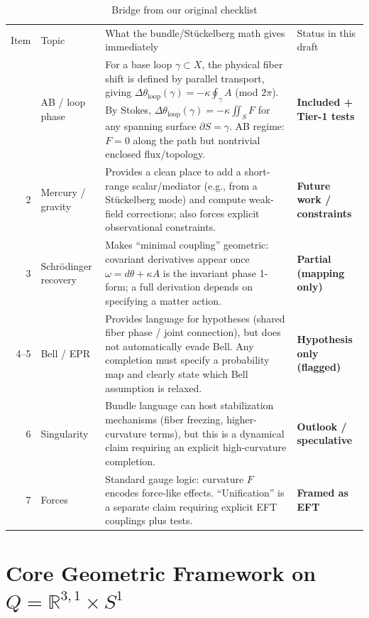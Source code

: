 ﻿\documentclass[twocolumn,aps,prd,nofootinbib]{revtex4-2}
\begin{document}
\begin{table}[!htbp]
\caption{Bridge from our original checklist}
\begin{ruledtabular}
\begin{tabular}{r l p{} p{}}
                Item & Topic & What the bundle/St\"uckelberg math gives immediately & Status in this draft \\
\colrule
1 & AB / loop phase & For a base loop $\gamma\subset X$, the physical fiber shift is defined by parallel transport, giving $\Delta\theta_{\mathrm{loop}}(\gamma)=-\kappa\oint_\gamma A$ (mod $2\pi$). By Stokes, $\Delta\theta_{\mathrm{loop}}(\gamma)=-\kappa\iint_S F$ for any spanning surface $\partial S=\gamma$. AB regime: $F=0$ along the path but nontrivial enclosed flux/topology. & \textbf{Included + Tier-1 tests} \\
2 & Mercury / gravity & Provides a clean place to add a short-range scalar/mediator (e.g., from a St\"uckelberg mode) and compute weak-field corrections; also forces explicit observational constraints. & \textbf{Future work / constraints} \\
3 & Schr\"odinger recovery & Makes ``minimal coupling'' geometric: covariant derivatives appear once $\omega=d\theta+\kappa A$ is the invariant phase 1-form; a full derivation depends on specifying a matter action. & \textbf{Partial (mapping only)} \\
4--5 & Bell / EPR & Provides language for hypotheses (shared fiber phase / joint connection), but does not automatically evade Bell. Any completion must specify a probability map and clearly state which Bell assumption is relaxed. & \textbf{Hypothesis only (flagged)} \\
6 & Singularity & Bundle language can host stabilization mechanisms (fiber freezing, higher-curvature terms), but this is a dynamical claim requiring an explicit high-curvature completion. & \textbf{Outlook / speculative} \\
7 & Forces & Standard gauge logic: curvature $F$ encodes force-like effects. ``Unification'' is a separate claim requiring explicit EFT couplings plus tests. & \textbf{Framed as EFT} \\
\end{tabular}
\end{ruledtabular}
\label{tab:checklist}
\end{table}

\section{Core Geometric Framework on $Q = \mathbb{R}^{3,1} \times S^1$}\label{sec:framework}
\end{document}
